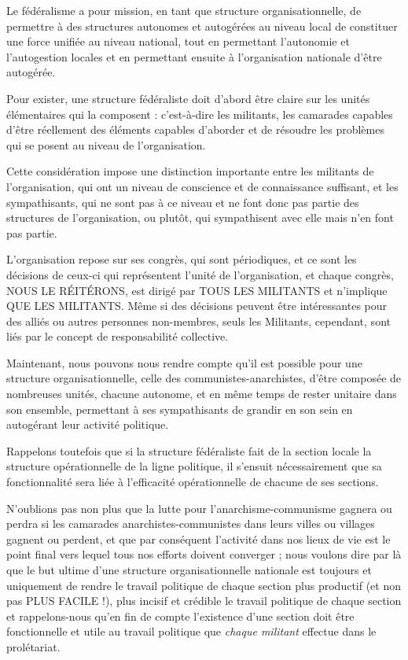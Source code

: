 Le fédéralisme a pour mission, en tant que structure organisationnelle, de permettre à des structures autonomes et autogérées au niveau local de constituer une force unifiée au niveau national, tout en permettant l'autonomie et l'autogestion locales et en permettant ensuite à l'organisation nationale d'être autogérée.

Pour exister, une structure fédéraliste doit d'abord être claire sur les unités élémentaires qui la composent : c'est-à-dire les militants, les camarades capables d'être réellement des éléments capables d'aborder et de résoudre les problèmes qui se posent au niveau de l'organisation.

Cette considération impose une distinction importante entre les militants de l'organisation, qui ont un niveau de conscience et de connaissance suffisant, et les sympathisants, qui ne sont pas à ce niveau et ne font donc pas partie des structures de l'organisation, ou plutôt, qui sympathisent avec elle mais n'en font pas partie.

L'organisation repose sur ses congrès, qui sont périodiques, et ce sont les décisions de ceux-ci qui représentent l'unité de l'organisation, et chaque congrès, NOUS LE RÉITÉRONS, est dirigé par TOUS LES MILITANTS et n'implique QUE LES MILITANTS. Même si des décisions peuvent être intéressantes pour des alliés ou autres personnes non-membres, seuls les Militants, cependant, sont liés par le concept de responsabilité collective.

Maintenant, nous pouvons nous rendre compte qu'il est possible pour une structure organisationnelle, celle des communistes-anarchistes, d'être composée de nombreuses unités, chacune autonome, et en même temps de rester unitaire dans son ensemble, permettant à ses sympathisants de grandir en son sein en autogérant leur activité politique.

Rappelons toutefois que si la structure fédéraliste fait de la section locale la structure opérationnelle de la ligne politique, il s'ensuit nécessairement que sa fonctionnalité sera liée à l'efficacité opérationnelle de chacune de ses sections.

N'oublions pas non plus que la lutte pour l'anarchisme-communisme gagnera ou perdra si les camarades anarchistes-communistes dans leurs villes ou villages gagnent ou perdent, et que par conséquent l'activité dans nos lieux de vie est le point final vers lequel tous nos efforts doivent converger ; nous voulons dire par là que le but ultime d'une structure organisationnelle nationale est toujours et uniquement de rendre le travail politique de chaque section plus productif (et non pas PLUS FACILE !), plus incisif et crédible le travail politique de chaque section et rappelons-nous qu'en fin de compte l'existence d'une section doit être fonctionnelle et utile au travail politique que \emph{chaque militant} effectue dans le prolétariat.

